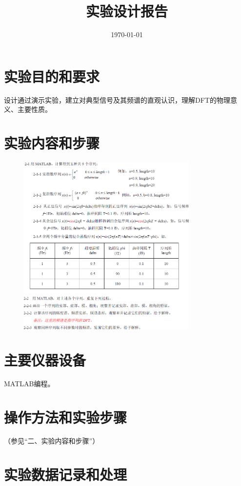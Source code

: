 \documentclass{../source/zjureport}
\title{实验设计报告}
\date{\today}
\begin{document}
    \makeheader
    \section{实验目的和要求}
    设计通过演示实验，建立对典型信号及其频谱的直观认识，理解DFT的物理意义、主要性质。

    \section{实验内容和步骤}
        \begin{figure}[!htp]
            \centering
            \includegraphics[width = 0.8\textwidth]{figure/page1.png}
        \end{figure}
        \newpage
    
    \section{主要仪器设备}
    MATLAB编程。
    \section{操作方法和实验步骤}
    （参见“二、实验内容和步骤”）
    \section{实验数据记录和处理}
        
        \newpage
        
        
        
        
        
        
        
\end{document}
